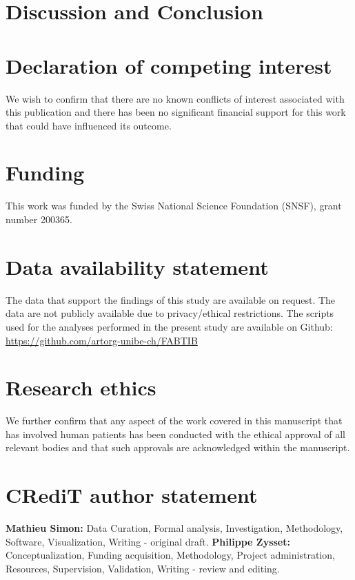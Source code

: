 \documentclass[a4paper,fleqn]{DC_ArtStyle}
\begin{document}
	\section{Discussion and Conclusion}
	
	
	\section*{Declaration of competing interest}
	We wish to confirm that there are no known conflicts of interest associated with this publication and there has been no significant financial support for this work that could have influenced its outcome.
	
	\section*{Funding}
	This work was funded by the Swiss National Science Foundation (SNSF), grant number 200365.

	\section*{Data availability statement}
	The data that support the findings of this study are available on request. The data are not publicly available due to privacy/ethical restrictions. The scripts used for the analyses performed in the present study are available on Github: \url{https://github.com/artorg-unibe-ch/FABTIB}
	
	\section*{Research ethics}
	We further confirm that any aspect of the work covered in this manuscript that has involved human patients has been conducted with the ethical approval of all relevant bodies and that such approvals are acknowledged within the manuscript.
	
	\section*{CRediT author statement}
	\textbf{Mathieu Simon:} Data Curation, Formal analysis, Investigation, Methodology, Software, Visualization, Writing - original draft.
	\textbf{Philippe Zysset:} Conceptualization, Funding acquisition, Methodology, Project administration, Resources, Supervision, Validation, Writing - review and editing.
	
\end{document}
